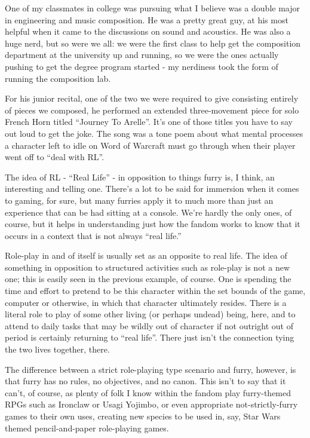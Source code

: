 One of my classmates in college was pursuing what I believe was a double
major in engineering and music composition. He was a pretty great guy,
at his most helpful when it came to the discussions on sound and
acoustics. He was also a huge nerd, but so were we all: we were the
first class to help get the composition department at the university up
and running, so we were the ones actually pushing to get the degree
program started - my nerdiness took the form of running the composition
lab.

For his junior recital, one of the two we were required to give
consisting entirely of pieces we composed, he performed an extended
three-movement piece for solo French Horn titled ``Journey To Arelle''.
It's one of those titles you have to say out loud to get the joke. The
song was a tone poem about what mental processes a character left to
idle on Word of Warcraft must go through when their player went off to
``deal with RL''.

The idea of RL - ``Real Life'' - in opposition to things furry is, I
think, an interesting and telling one. There's a lot to be said for
immersion when it comes to gaming, for sure, but many furries apply it
to much more than just an experience that can be had sitting at a
console. We're hardly the only ones, of course, but it helps in
understanding just how the fandom works to know that it occurs in a
context that is not always ``real life.''

Role-play in and of itself is usually set as an opposite to real life.
The idea of something in opposition to structured activities such as
role-play is not a new one; this is easily seen in the previous example,
of course. One is spending the time and effort to pretend to be this
character within the set bounds of the game, computer or otherwise, in
which that character ultimately resides. There is a literal role to play
of some other living (or perhaps undead) being, here, and to attend to
daily tasks that may be wildly out of character if not outright out of
period is certainly returning to ``real life''. There just isn't the
connection tying the two lives together, there.

The difference between a strict role-playing type scenario and furry,
however, is that furry has no rules, no objectives, and no canon. This
isn't to say that it can't, of course, as plenty of folk I know within
the fandom play furry-themed RPGs such as Ironclaw or Usagi Yojimbo, or
even appropriate not-strictly-furry games to their own uses, creating
new species to be used in, say, Star Wars themed pencil-and-paper
role-playing games.

